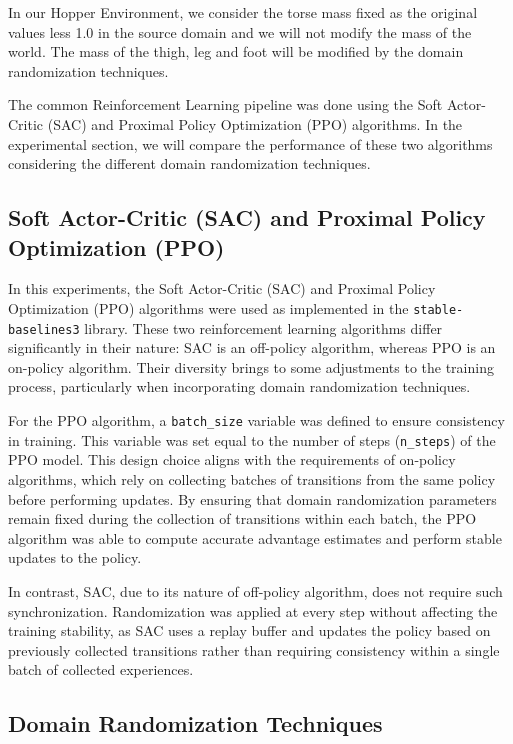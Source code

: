 \documentclass[12pt]{article}
\begin{document}
In our Hopper Environment, we consider the torse mass fixed as the original values less 1.0 in the source domain and we will not modify the mass of the world. The mass of the thigh, leg and foot will be modified by the domain randomization techniques.

The common Reinforcement Learning pipeline was done using the Soft Actor-Critic (SAC) and Proximal Policy Optimization (PPO) algorithms. In the experimental section, we will compare the performance of these two algorithms considering the different domain randomization techniques.


\subsection{Soft Actor-Critic (SAC) and Proximal Policy Optimization (PPO)}

In this experiments, the Soft Actor-Critic (SAC) and Proximal Policy Optimization (PPO) algorithms were used as implemented in the \texttt{stable-baselines3} library. These two reinforcement learning algorithms differ significantly in their nature: SAC is an off-policy algorithm, whereas PPO is an on-policy algorithm. Their diversity brings to some adjustments to the training process, particularly when incorporating domain randomization techniques.

For the PPO algorithm, a \texttt{batch\_size} variable was defined to ensure consistency in training. This variable was set equal to the number of steps (\texttt{n\_steps}) of the PPO model. This design choice aligns with the requirements of on-policy algorithms, which rely on collecting batches of transitions from the same policy before performing updates. By ensuring that domain randomization parameters remain fixed during the collection of transitions within each batch, the PPO algorithm was able to compute accurate advantage estimates and perform stable updates to the policy.

In contrast, SAC, due to its nature of off-policy algorithm, does not require such synchronization. Randomization was applied at every step without affecting the training stability, as SAC uses a replay buffer and updates the policy based on previously collected transitions rather than requiring consistency within a single batch of collected experiences.

\subsection{Domain Randomization Techniques}
\end{document}
